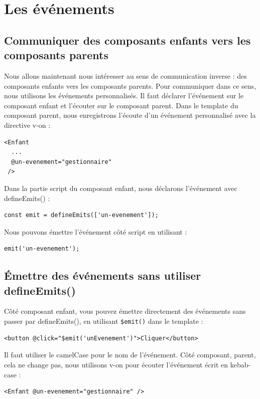 \documentclass{article}
\begin{document}

\section{Les événements}
\subsection{Communiquer des composants enfants vers les composants parents}
Nous allons maintenant nous intéresser au sens de communication inverse : des composants enfants vers les composants parents. Pour communiquer dans ce sens, nous utilisons les événements personnalisés. Il faut déclarer l'événement sur le composant enfant et l'écouter sur le composant parent. Dans le {\color{monOrange}template} du composant parent, nous enregistrons l'écoute d'un événement personnalisé avec la directive {\color{monOrange}v-on} :
\begin{verbatim}
<Enfant
  ...
  @un-evenement="gestionnaire"
 />
\end{verbatim}
Dans la partie {\color{monOrange}script} du composant enfant, nous déclarons l'événement avec {\color{monOrange}defineEmits()} :
\begin{verbatim}
const emit = defineEmits(['un-evenement']);
\end{verbatim}
Nous pouvons émettre l'événement côté {\color{monOrange}script} en utilisant :
\begin{verbatim}
emit('un-evenement');
\end{verbatim}

\subsection{Émettre des événements sans utiliser defineEmits()}
Côté composant enfant, vous pouvez émettre directement des événements sans passer par {\color{monOrange}defineEmits()}, en utilisant {\tt \$emit()} dans le {\color{monOrange}template} :
\begin{verbatim}
<button @click="$emit('unEvenement')">Cliquer</button>
\end{verbatim}
Il faut utiliser le {\color{monOrange}camelCase} pour le nom de l'événement. Côté composant, parent, cela ne change pas, nous utilisons {\color{monOrange}v-on} pour écouter l'événement écrit en {\color{monOrange}kebab-case} :
\begin{verbatim}
<Enfant @un-evenement="gestionnaire" />
\end{verbatim}
\end{document}
